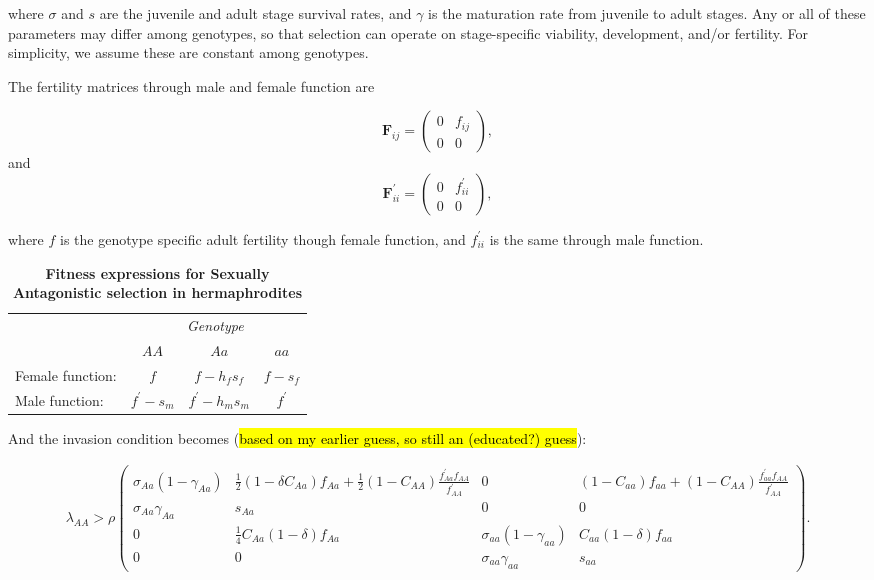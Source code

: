 \documentclass[11pt]{article}
\def\mbf#1{\mathbf{#1}}
\begin{document}
\noindent where $\sigma$ and $s$ are the juvenile and adult stage survival rates, and $\gamma$ is the maturation rate from juvenile to adult stages. Any or all of these parameters may differ among genotypes, so that selection can operate on stage-specific viability, development, and/or fertility. For simplicity, we assume these are constant among genotypes. 

The fertility matrices through male and female function are

\begin{equation}
	\mbf{F}_{ij} = \left(
					\begin{array}{cc}
						0 &  f_{ij} \\
						0 & 0
					\end{array}
				\right),
\end{equation}
\noindent and
\begin{equation}
	\mbf{F}^{\prime}_{ii} = \left(
					\begin{array}{cc}
						0 &  f^{\prime}_{ii} \\
						0 & 0
					\end{array}
				\right),
\end{equation}

\noindent where $f$ is the genotype specific adult fertility though female function, and $f^{\prime}_{ii}$ is the same through male function. 
\begin{table}[htbp]
 \centering
 \caption{\bf Fitness expressions for Sexually Antagonistic selection in hermaphrodites}
\begin{tabular}{lccc}
 \toprule
					&  \multicolumn{3}{c}{{\textit{Genotype}}} \\ 
\cline{2-4}
					& $AA$			& $Aa$ 					& $aa$ 		\\ \hline
Female function:	& $f$		& $f - h_f s_f$	& $f - s_f$ \\	
Male function:		& $f^\prime - s_m$& $f^\prime - h_m s_m$	& $f^\prime$ 		\\	
\hline
\end{tabular}
\end{table}

And the invasion condition becomes (\hl{based on my earlier guess, so still an (educated?) guess}):

\begin{eqnarray} \label{eq:coexist_AA}
\lambda_{AA}> 
			\rho\left(
					\begin{array}{cc|cc}
						\sigma_{Aa}(1 - \gamma_{Aa}) &  \frac{1}{2} (1 - \delta C_{Aa}) f_{Aa} +\frac{1}{2} (1 - C_{AA})\frac{f^\prime_{Aa}f_{AA}}{f^\prime_{AA}} &0 & (1-C_{aa})f_{aa}+ (1 - C_{AA})\frac{f^\prime_{aa}f_{AA}}{f^\prime_{AA}}\\
						\sigma_{Aa} \gamma_{Aa}     & s_{Aa}& 0 & 0\\ \hline
							0 & \frac{1}{4}C_{Aa}(1-\delta)f_{Aa} &\sigma_{aa}(1 - \gamma_{aa})  & C_{aa}(1-\delta)f_{aa}\\
								0 & 0 & \sigma_{aa} \gamma_{aa}     & s_{aa}
					\end{array}
				\right). 
\end{eqnarray} 
\end{document}
